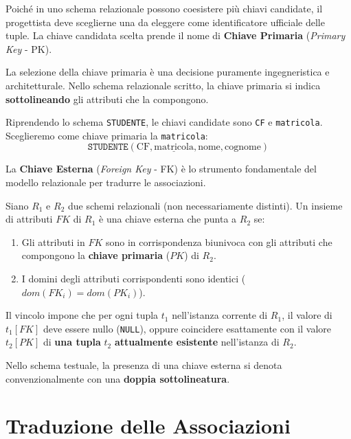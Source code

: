\medskip

Poiché in uno schema relazionale possono coesistere più chiavi candidate, il progettista deve sceglierne una da eleggere come identificatore ufficiale delle tuple. La chiave candidata scelta prende il nome di \textbf{Chiave Primaria} (\textit{Primary Key} - PK).

La selezione della chiave primaria è una decisione puramente ingegneristica e architetturale. Nello schema relazionale scritto, la chiave primaria si indica \textbf{sottolineando} gli attributi che la compongono.

\begin{example}
Riprendendo lo schema \texttt{STUDENTE}, le chiavi candidate sono \texttt{CF} e \texttt{matricola}. Sceglieremo come chiave primaria la \texttt{matricola}:
$$\texttt{STUDENTE}(\text{CF}, \underline{\text{matricola}}, \text{nome}, \text{cognome})$$
\end{example}

\medskip

La \textbf{Chiave Esterna} (\textit{Foreign Key} - FK) è lo strumento fondamentale del modello relazionale per tradurre le associazioni.

Siano $R_1$ e $R_2$ due schemi relazionali (non necessariamente distinti). Un insieme di attributi $FK$ di $R_1$ è una chiave esterna che punta a $R_2$ se:
\begin{enumerate}
    \item Gli attributi in $FK$ sono in corrispondenza biunivoca con gli attributi che compongono la \textbf{chiave primaria} ($PK$) di $R_2$.
    \item I domini degli attributi corrispondenti sono identici ($dom(FK_i) = dom(PK_i)$).
\end{enumerate}

\medskip

Il vincolo impone che per ogni tupla $t_1$ nell'istanza corrente di $R_1$, il valore di $t_1[FK]$ deve essere nullo (\texttt{NULL}), oppure coincidere esattamente con il valore $t_2[PK]$ di \textbf{una tupla} $t_2$ \textbf{attualmente esistente} nell'istanza di $R_2$.

Nello schema testuale, la presenza di una chiave esterna si denota convenzionalmente con una \textbf{doppia sottolineatura}.

\section{Traduzione delle Associazioni}

